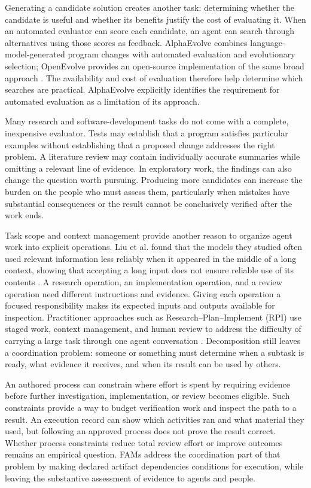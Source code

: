 \documentclass[letterpaper]{article}
\theoremstyle{definition}
\begin{document}
Generating a candidate solution creates another task: determining whether the
candidate is useful and whether its benefits justify the cost of evaluating
it. When an automated evaluator can score each candidate, an agent can search
through alternatives using those scores as feedback. AlphaEvolve combines
language-model-generated program changes with automated evaluation and
evolutionary selection; OpenEvolve provides an open-source implementation of
the same broad approach \cite{novikov2025alphaevolve,sharma2025openevolve}.
The availability and cost of evaluation therefore help determine which
searches are practical. AlphaEvolve explicitly identifies the requirement for
automated evaluation as a limitation of its approach.

Many research and software-development tasks do not come with a complete,
inexpensive evaluator. Tests may establish that a program satisfies particular
examples without establishing that a proposed change addresses the right
problem. A literature review may contain individually accurate summaries while
omitting a relevant line of evidence. In exploratory work, the findings can
also change the question worth pursuing. Producing more candidates can
increase the burden on the people who must assess them, particularly when
mistakes have substantial consequences or the result cannot be conclusively
verified after the work ends.

Task scope and context management provide another reason to organize agent
work into explicit operations. Liu et al. found that the models they studied
often used relevant information less reliably when it appeared in the middle
of a long context, showing that accepting a long input does not ensure
reliable use of its contents \cite{liu2023lostmiddle}. A research operation, an implementation
operation, and a review operation need different instructions and evidence.
Giving each operation a focused responsibility makes its expected inputs and
outputs available for inspection. Practitioner approaches such as
Research--Plan--Implement (RPI) use staged work, context management, and human
review to address the difficulty of carrying a large task through one agent
conversation \cite{dex2025context}. Decomposition still leaves a coordination
problem: someone or something must determine when a subtask is ready, what
evidence it receives, and when its result can be used by others.

An authored process can constrain where effort is spent by requiring evidence
before further investigation, implementation, or review becomes eligible.
Such constraints provide a way to budget verification work and inspect the
path to a result. An execution record can show which activities ran and what
material they used, but following an approved process does not prove the
result correct. Whether process constraints reduce total review effort or
improve outcomes remains an empirical question. FAMs address the coordination
part of that problem by making declared artifact dependencies conditions for
execution, while leaving the substantive assessment of evidence to agents
and people.
\end{document}
